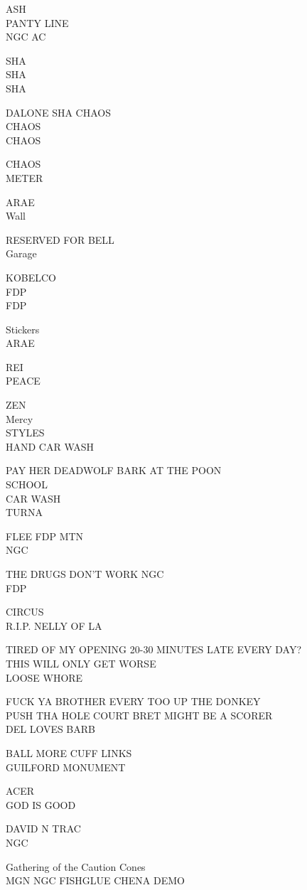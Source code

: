 \documentclass[10pt,letterpaper]{article}
\begin{document}
ASH\\
PANTY LINE\\
NGC AC

SHA\\
SHA\\
SHA

DALONE SHA CHAOS\\
CHAOS\\
CHAOS

CHAOS\\
METER

ARAE\\
Wall

RESERVED FOR BELL\\
Garage

KOBELCO\\
FDP\\
FDP

Stickers\\
ARAE

REI\\
PEACE

ZEN\\
Mercy\\
STYLES\\
HAND CAR WASH

PAY HER DEADWOLF BARK AT THE POON\\
SCHOOL\\
CAR WASH\\
TURNA

FLEE FDP MTN\\
NGC

THE DRUGS DON'T WORK NGC\\
FDP

CIRCUS\\
R.I.P. NELLY OF LA

TIRED OF MY OPENING 20{-}30 MINUTES LATE EVERY DAY?\\
THIS WILL ONLY GET WORSE\\
LOOSE WHORE

FUCK YA BROTHER EVERY TOO UP THE DONKEY\\
PUSH THA HOLE COURT BRET MIGHT BE A SCORER\\
DEL LOVES BARB

BALL MORE CUFF LINKS\\
GUILFORD MONUMENT

ACER\\
GOD IS GOOD

DAVID N TRAC\\
NGC

Gathering of the Caution Cones\\
MGN NGC FISHGLUE CHENA DEMO
\pagebreak
\end{document}
